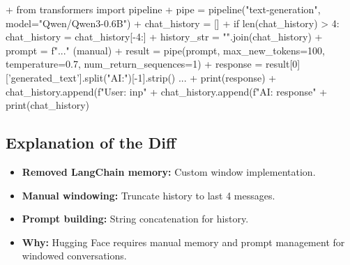 \documentclass[11pt, a4paper]{article}
\begin{document}
\begin{addedcode}
\begin{diffverb}
+ from transformers import pipeline
+ pipe = pipeline("text-generation", model="Qwen/Qwen3-0.6B")
+ chat_history = []
+ if len(chat_history) > 4: chat_history = chat_history[-4:]
+ history_str = "\n".join(chat_history)
+ prompt = f"..." (manual)
+ result = pipe(prompt, max_new_tokens=100, temperature=0.7, num_return_sequences=1)
+ response = result[0]['generated_text'].split("AI:")[-1].strip() ...
+ print(response)
+ chat_history.append(f"User: {inp}"
+ chat_history.append(f"AI: {response}"
+ print(chat_history)
\end{diffverb}
\end{addedcode}


\subsection{Explanation of the Diff}
\begin{itemize}
    \item \textbf{Removed LangChain memory:} Custom window implementation.
    \item \textbf{Manual windowing:} Truncate history to last 4 messages.
    \item \textbf{Prompt building:} String concatenation for history.
    \item \textbf{Why:} Hugging Face requires manual memory and prompt management for windowed conversations.
\end{itemize}


\newpage
\end{document}
